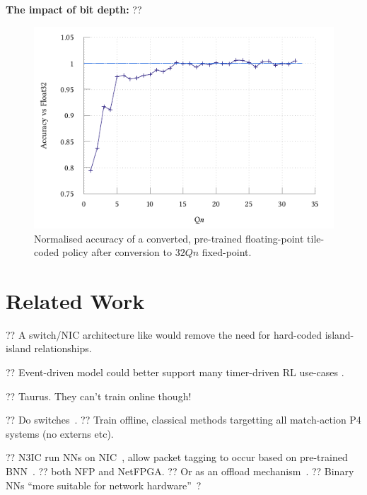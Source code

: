 \documentclass[sigconf,natbib=false]{acmart}
\newcommand{\fakepara}[1]{\noindent\textbf{#1:}}
\begin{document}
\fakepara{The impact of bit depth}
?? 

\begin{figure}
	\includegraphics{../plots/build/marl-quant/accuracy-binary}
	\caption{Normalised accuracy of a converted, pre-trained floating-point tile-coded policy after conversion to $32Qn$ fixed-point.}\label{fig:quant-acc}
\end{figure}

\section{Related Work}

?? A switch/NIC architecture like \textcite{DBLP:conf/hotnets/StephensAS18} would remove the need for hard-coded island-island relationships.

?? Event-driven model could better support many timer-driven RL use-cases \textcite{DBLP:conf/hotnets/IbanezABM19}.

?? Taurus. They can't train online though!~\parencite{DBLP:journals/corr/abs-2002-08987}

?? Do switches~\parencite{DBLP:conf/hotnets/XiongZ19}.
?? Train offline, classical methods targetting all match-action P4 systems (no externs etc).

?? N3IC run NNs on NIC~\parencite{DBLP:journals/corr/abs-2009-02353}, allow packet tagging to occur based on pre-trained BNN~\parencite{DBLP:conf/nips/HubaraCSEB16}.
?? both NFP and NetFPGA.
?? Or as an offload mechanism~\parencite{DBLP:conf/sigcomm/SanvitoSB18,DBLP:journals/corr/abs-1801-05731}.
?? Binary NNs ``more suitable for network hardware''~\parencite{DBLP:journals/corr/MiyashitaLM16}?
\end{document}
